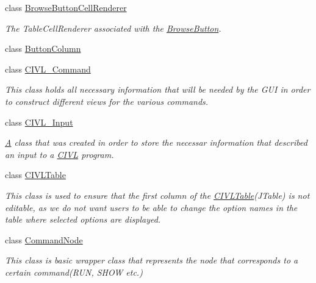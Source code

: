 \begin{DoxyCompactItemize}
class \hyperlink{classedu_1_1udel_1_1cis_1_1vsl_1_1civl_1_1gui_1_1common_1_1BrowseButtonCellRenderer}{Browse\+Button\+Cell\+Renderer}
\begin{DoxyCompactList}\small\item\em The Table\+Cell\+Renderer associated with the \hyperlink{classedu_1_1udel_1_1cis_1_1vsl_1_1civl_1_1gui_1_1common_1_1BrowseButton}{Browse\+Button}. \end{DoxyCompactList}\item 
class \hyperlink{classedu_1_1udel_1_1cis_1_1vsl_1_1civl_1_1gui_1_1common_1_1ButtonColumn}{Button\+Column}
\item 
class \hyperlink{classedu_1_1udel_1_1cis_1_1vsl_1_1civl_1_1gui_1_1common_1_1CIVL__Command}{C\+I\+V\+L\+\_\+\+Command}
\begin{DoxyCompactList}\small\item\em This class holds all necessary information that will be needed by the G\+U\+I in order to construct different views for the various commands. \end{DoxyCompactList}\item 
class \hyperlink{classedu_1_1udel_1_1cis_1_1vsl_1_1civl_1_1gui_1_1common_1_1CIVL__Input}{C\+I\+V\+L\+\_\+\+Input}
\begin{DoxyCompactList}\small\item\em \hyperlink{structA}{A} class that was created in order to store the necessar information that described an input to a \hyperlink{classedu_1_1udel_1_1cis_1_1vsl_1_1civl_1_1CIVL}{C\+I\+V\+L} program. \end{DoxyCompactList}\item 
class \hyperlink{classedu_1_1udel_1_1cis_1_1vsl_1_1civl_1_1gui_1_1common_1_1CIVLTable}{C\+I\+V\+L\+Table}
\begin{DoxyCompactList}\small\item\em This class is used to ensure that the first column of the {\ttfamily \hyperlink{classedu_1_1udel_1_1cis_1_1vsl_1_1civl_1_1gui_1_1common_1_1CIVLTable}{C\+I\+V\+L\+Table}}(J\+Table) is not editable, as we do not want users to be able to change the option names in the table where selected options are displayed. \end{DoxyCompactList}\item 
class \hyperlink{classedu_1_1udel_1_1cis_1_1vsl_1_1civl_1_1gui_1_1common_1_1CommandNode}{Command\+Node}
\begin{DoxyCompactList}\small\item\em This class is basic wrapper class that represents the node that corresponds to a certain command(R\+U\+N, S\+H\+O\+W etc.) \end{DoxyCompactList}\item 

\end{DoxyCompactItemize}
